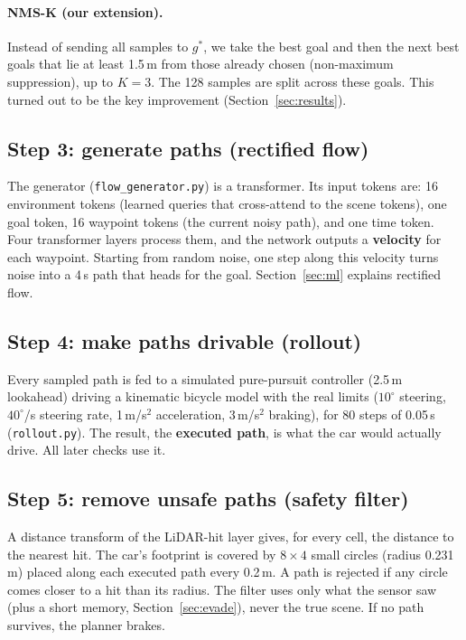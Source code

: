\documentclass[11pt,a4paper]{article}
\newcommand{\code}[1]{\texttt{#1}}
\newcommand{\term}[1]{\textbf{#1}}
\begin{document}
\paragraph{NMS-K (our extension).} Instead of sending all samples to $g^*$, we take the best goal and then
the next best goals that lie at least 1.5\,m from those already chosen (non-maximum suppression), up to
$K=3$. The 128 samples are split across these goals. This turned out to be the key improvement
(Section~\ref{sec:results}).

\subsection{Step 3: generate paths (rectified flow)}
The generator (\code{flow\_generator.py}) is a transformer. Its input tokens are: 16 environment tokens
(learned queries that cross-attend to the scene tokens), one goal token, 16 waypoint tokens (the current
noisy path), and one time token. Four transformer layers process them, and the network outputs a
\term{velocity} for each waypoint. Starting from random noise, one step along this velocity turns noise
into a 4\,s path that heads for the goal. Section~\ref{sec:ml} explains rectified flow.

\subsection{Step 4: make paths drivable (rollout)}
Every sampled path is fed to a simulated pure-pursuit controller (2.5\,m lookahead) driving a kinematic
bicycle model with the real limits ($10^\circ$ steering, $40^\circ$/s steering rate, 1\,m/s$^2$
acceleration, 3\,m/s$^2$ braking), for 80 steps of 0.05\,s (\code{rollout.py}). The result, the
\term{executed path}, is what the car would actually drive. All later checks use it.

\subsection{Step 5: remove unsafe paths (safety filter)}
A distance transform of the LiDAR-hit layer gives, for every cell, the distance to the nearest hit. The
car's footprint is covered by $8\times4$ small circles (radius 0.231\,m) placed along each executed path
every 0.2\,m. A path is rejected if any circle comes closer to a hit than its radius. The filter uses only
what the sensor saw (plus a short memory, Section~\ref{sec:evade}), never the true scene. If no path
survives, the planner brakes.
\end{document}
